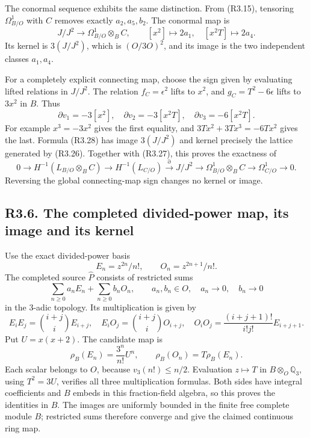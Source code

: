 \documentclass[
  10pt,
]{article}
\begin{document}
The conormal sequence exhibits the same distinction. From (R3.15),
tensoring \(\Omega^1_{B/O}\) with \(C\) removes exactly \(a_2,a_5,b_2\).
The conormal map is \[
J/J^2\longrightarrow\Omega^1_{B/O}\otimes_B C,\qquad
[x^2]\longmapsto2a_1,\quad[x^2T]\longmapsto2a_4.
\tag{R3.27}
\] Its kernel is \(3(J/J^2)\), which is \((O/3O)^2\), and its image is
the two independent classes \(a_1,a_4\).

For a completely explicit connecting map, choose the sign given by
evaluating lifted relations in \(J/J^2\). The relation
\(f_C=\epsilon^2\) lifts to \(x^2\), and \(g_C=T^2-6\epsilon\) lifts to
\(3x^2\) in \(B\). Thus \[
\partial v_1=-3[x^2],\quad
\partial v_2=-3[x^2T],\quad
\partial v_3=-6[x^2T].
\tag{R3.28}
\] For example \(x^3=-3x^2\) gives the first equality, and
\(3Tx^2+3Tx^3=-6Tx^2\) gives the last. Formula (R3.28) has image
\(3(J/J^2)\) and kernel precisely the lattice generated by (R3.26).
Together with (R3.27), this proves the exactness of \[
0\longrightarrow H^{-1}(L_{B/O}\otimes_B C)
\longrightarrow H^{-1}(L_{C/O})
\xrightarrow{\partial}J/J^2
\longrightarrow\Omega^1_{B/O}\otimes_B C
\longrightarrow\Omega^1_{C/O}\longrightarrow0.
\tag{R3.29}
\] Reversing the global connecting-map sign changes no kernel or image.

\subsection{R3.6. The completed divided-power map, its image and its
kernel}\label{r3.6.-the-completed-divided-power-map-its-image-and-its-kernel}

Use the exact divided-power basis \[
E_n=z^{2n}/n!,\qquad O_n=z^{2n+1}/n!.
\] The completed source \(\widehat P\) consists of restricted sums \[
\sum_{n\ge0}a_nE_n+\sum_{n\ge0}b_nO_n,\qquad
a_n,b_n\in O,\quad a_n\to0,\quad b_n\to0
\] in the 3-adic topology. Its multiplication is given by \[
E_iE_j=\binom{i+j}{i}E_{i+j},\quad
E_iO_j=\binom{i+j}{i}O_{i+j},\quad
O_iO_j=\frac{(i+j+1)!}{i!j!}E_{i+j+1}.
\tag{R3.30}
\] Put \(U=x(x+2)\). The candidate map is \[
\rho_B(E_n)=\frac{3^n}{n!}U^n,\qquad
\rho_B(O_n)=T\rho_B(E_n).
\tag{R3.31}
\] Each scalar belongs to \(O\), because \(v_3(n!)\le n/2\). Evaluation
\(z\mapsto T\) in \(B\otimes_O\mathbb Q_3\), using \(T^2=3U\), verifies
all three multiplication formulas. Both sides have integral coefficients
and \(B\) embeds in this fraction-field algebra, so this proves the
identities in \(B\). The images are uniformly bounded in the finite free
complete module \(B\); restricted sums therefore converge and give the
claimed continuous ring map.
\end{document}
